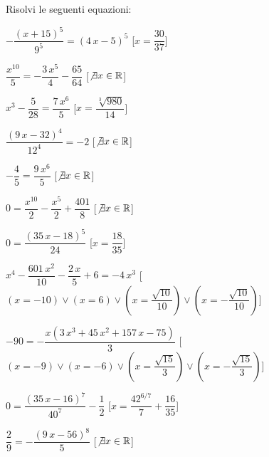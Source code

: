 \begin{esercizio}\label{ese:03.1}
Risolvi le seguenti equazioni:
\begin{enumeratea}
\item $-{\dfrac{ \left( x+15 \right) ^{5}}{9^5}}= \left( 4\,x-5 \right) 
^{5}$ 
\hfill [$x={\dfrac{30}{37}}$]
\item ${\dfrac{{x}^{10}}{5}}=-{\dfrac{3\,{x}^{5}}{4}}-{\dfrac{65}{64}}$ 
\hfill [$\not\exists x \in \mathbb{R}$]
\item ${x}^{3}-{\dfrac{5}{28}}={\dfrac{7\,{x}^{6}}{5}}$ 
\hfill [$x={\dfrac{\sqrt [3]{980}}{14}}$]
\item ${\dfrac{ \left( 9\,x-32 \right) ^{4}}{12^4}}=-2$ 
\hfill [$\not\exists x \in \mathbb{R}$]
\item $-{\dfrac{4}{5}}={\dfrac{9\,{x}^{6}}{5}}$ 
\hfill [$\not\exists x \in \mathbb{R}$]
\item $0={\dfrac{{x}^{10}}{2}}-{\dfrac{{x}^{5}}{2}}+{\dfrac{401}{8}}$ 
\hfill [$\not\exists x \in \mathbb{R}$]
\item $0={\dfrac{ \left( 35\,x-18 \right) ^{5}}{24}}$ 
\hfill [$x={\dfrac{18}{35}}$]
\item ${x}^{4}-{\dfrac{601\,{x}^{2}}{10}}-{\dfrac
{2\,x}{5}}+6=-4\,{x}^{3}$ 
\hfill [$(x=-10)\vee (x=6)\vee (x={\dfrac{\sqrt {10}}{10}})\vee 
(x=-{\dfrac
{\sqrt {10}}{10}})$]
\item $-90=-{\dfrac{x \left( 3\,{x}^{3}+45\,{x}^{2}+157\,x-75 \right) 
}{3}}$ 
\hfill [$(x=-9)\vee (x=-6)\vee (x={\dfrac{\sqrt {15}}{3}})\vee (x=-{\dfrac
{\sqrt 
{15}}{3}})$]
\item $0={\dfrac{ \left( 35\,x-16 \right) ^{7}}{40^7}}-{\dfrac{1}{2}}$ 
\hfill [$x={\dfrac{4 {2}^{6/7}}{7}}+{\dfrac{16}{35}}$]
\item ${\dfrac{2}{9}}=-{\dfrac{ \left( 9\,x-56 \right) ^{8}}{5}}$ 
\hfill [$\not\exists x \in \mathbb{R}$]

\end{enumeratea}
\end{esercizio}
